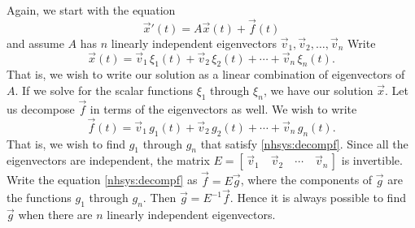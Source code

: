 Again, we start with the equation
\begin{equation} \label{nhsys:ednhsys2}
{\vec{x}}' (t) = A \vec{x}(t) + \vec{f}(t)
\end{equation}
and assume $A$ has $n$ linearly independent eigenvectors
$\vec{v}_1, \vec{v}_2, \ldots, \vec{v}_n$
 Write
\begin{equation} \label{nhsys:decompx}
\vec{x}(t) =
\vec{v}_1 \, \xi_1(t) + 
\vec{v}_2 \, \xi_2(t) + \cdots +
\vec{v}_n \, \xi_n(t) .
\end{equation}
That is, we wish to write our solution as a linear combination of
eigenvectors of $A$.
If we solve for the scalar functions $\xi_1$ through $\xi_n$, we have
our solution $\vec{x}$.
Let us decompose $\vec{f}$ in terms of the eigenvectors as well.  We wish to write
\begin{equation} \label{nhsys:decompf}
\vec{f}(t) =
\vec{v}_1 \, g_1(t) + 
\vec{v}_2 \, g_2(t) + \cdots +
\vec{v}_n \, g_n(t) .
\end{equation}
That is, we wish to find $g_1$ through $g_n$ that satisfy
\eqref{nhsys:decompf}.  Since all the eigenvectors
are independent, the matrix
$E = [\, \vec{v}_1 \quad \vec{v}_2 \quad \cdots \quad \vec{v}_n \,]$
is invertible.  Write the equation \eqref{nhsys:decompf}
as $\vec{f} = E \vec{g}$, where the components of
$\vec{g}$ are the functions $g_1$ through $g_n$.
Then $\vec{g} = E^{-1} \vec{f}$.
Hence it is always possible to find $\vec{g}$ when there
are $n$ linearly independent eigenvectors.

